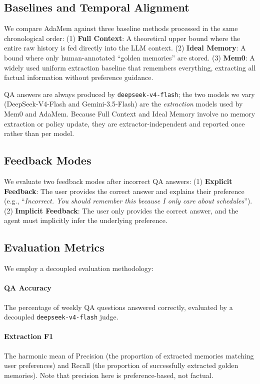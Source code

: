 \documentclass[11pt]{article}
\begin{document}
\subsection{Baselines and Temporal Alignment}
We compare AdaMem against three baseline methods processed in the same chronological order:
(1) \textbf{Full Context}: A theoretical upper bound where the entire raw history is fed directly into the LLM context.
(2) \textbf{Ideal Memory}: A bound where only human-annotated ``golden memories'' are stored.
(3) \textbf{Mem0}: A widely used uniform extraction baseline \cite{mem0} that remembers everything, extracting all factual information without preference guidance.

QA answers are always produced by \texttt{deepseek-v4-flash}; the two models we vary (DeepSeek-V4-Flash and Gemini-3.5-Flash) are the \emph{extraction} models used by Mem0 and AdaMem. Because Full Context and Ideal Memory involve no memory extraction or policy update, they are extractor-independent and reported once rather than per model.

\subsection{Feedback Modes}
We evaluate two feedback modes after incorrect QA answers:
(1) \textbf{Explicit Feedback}: The user provides the correct answer and explains their preference (e.g., ``\textit{Incorrect. You should remember this because I only care about schedules}'').
(2) \textbf{Implicit Feedback}: The user only provides the correct answer, and the agent must implicitly infer the underlying preference.

\subsection{Evaluation Metrics}
We employ a decoupled evaluation methodology:
\paragraph{QA Accuracy} The percentage of weekly QA questions answered correctly, evaluated by a decoupled \texttt{deepseek-v4-flash} judge.
\paragraph{Extraction F1} The harmonic mean of Precision (the proportion of extracted memories matching user preferences) and Recall (the proportion of successfully extracted golden memories). Note that precision here is preference-based, not factual.
\end{document}
